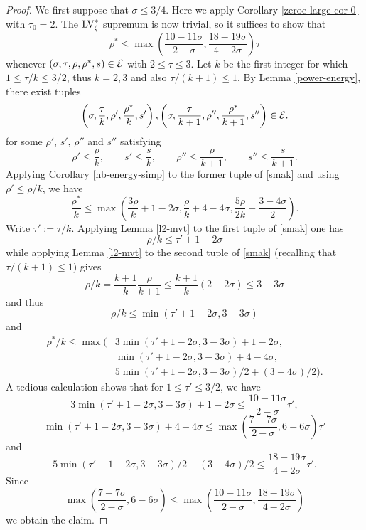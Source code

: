 \begin{proof} We first suppose that $\sigma \leq 3/4$.  Here we apply Corollary \ref{zeroe-large-cor-0} with $\tau_0 = 2$.  The $\mathrm{LV}^*_\zeta$ supremum is now trivial, so it suffices to show that
\begin{equation}\label{second-claim}
        \rho^* \leq \max\left( \frac{10-11\sigma}{2-\sigma}, \frac{18-19\sigma}{4-2\sigma}\right) \tau
\end{equation}
whenever $(\sigma,\tau,\rho,\rho^*,s) \in \mathcal{E}$ with $2 \leq \tau \leq 3$.  Let $k$ be the first integer for which $1 \leq \tau/k \leq 3/2$, thus $k=2,3$ and also $\tau/(k+1) \leq 1$.  By Lemma \ref{power-energy}, there exist tuples
\begin{equation}\label{smak}
\left(\sigma, \frac{\tau}{k}, \rho', \frac{\rho^*}{k}, s'\right), \left(\sigma,\frac{\tau}{k+1}, \rho'', \frac{\rho^*}{k + 1}, s''\right)  \in \mathcal{E}.
\end{equation}
for some $\rho'$, $s'$, $\rho''$ and $s''$ satisfying
\[
\rho' \le \frac{\rho}{k},\qquad s' \le \frac{s}{k},\qquad \rho'' \le \frac{\rho}{k+1},\qquad s'' \le \frac{s}{k+1}.
\]
Applying Corollary \ref{hb-energy-simp} to the former tuple of \eqref{smak} and using $\rho' \le \rho/k$, we have
$$\frac{\rho^*}{k} \leq \max \left(\frac{3\rho}{k} + 1-2\sigma, \frac{\rho}{k} +4-4\sigma, \frac{5\rho}{2k} + \frac{3-4\sigma}{2}\right).$$
Write $\tau' := \tau/k$. Applying Lemma \ref{l2-mvt} to the first tuple of \eqref{smak} one has
$$\rho/k \leq \tau' + 1 - 2\sigma$$
while applying Lemma \ref{l2-mvt} to the second tuple of \eqref{smak} (recalling that $\tau/(k+1) \le 1$) gives
$$\rho/k = \frac{k+1}{k} \frac{\rho}{k+1} \leq \frac{k+1}{k} (2-2\sigma) \le 3-3\sigma$$
and thus
\begin{equation}\label{rho-k}
\rho/k \leq \min( \tau'+1-2\sigma, 3-3\sigma)
\end{equation}
and
\begin{equation*}
    \begin{split}
        \rho^*/k \leq \max(&3 \min(\tau'+1-2\sigma,3-3\sigma) + 1-2\sigma, \\
        &\min(\tau'+1-2\sigma,3-3\sigma) +4-4\sigma, \\
        &5\min(\tau'+1-2\sigma,3-3\sigma)/2 + (3-4\sigma)/2).
    \end{split}
\end{equation*}
A tedious calculation shows that for $1 \leq \tau' \leq 3/2$, we have
$$3 \min(\tau'+1-2\sigma,3-3\sigma) + 1-2\sigma \leq \frac{10-11\sigma}{2-\sigma} \tau',$$
$$ \min(\tau'+1-2\sigma,3-3\sigma) +4-4\sigma \leq \max\left( \frac{7-7\sigma}{2-\sigma}, 6-6\sigma\right)\tau'$$
and
$$5\min(\tau'+1-2\sigma,3-3\sigma)/2 + (3-4\sigma)/2 \leq \frac{18-19\sigma}{4-2\sigma} \tau'.$$
Since
$$\max\left( \frac{7-7\sigma}{2-\sigma}, 6-6\sigma\right) \leq \max\left(\frac{10-11\sigma}{2-\sigma}, \frac{18-19\sigma}{4-2\sigma}\right)$$
we obtain the claim.


\end{proof}
